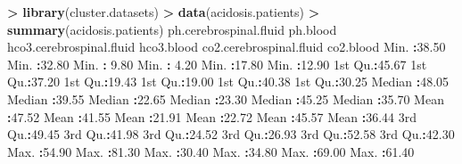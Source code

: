 \documentclass[]{book}
\newenvironment{Shaded}{\begin{snugshade}}{\end{snugshade}}
\newcommand{\KeywordTok}[1]{\textcolor[rgb]{0.13,0.29,0.53}{\textbf{#1}}}
\newcommand{\FloatTok}[1]{\textcolor[rgb]{0.00,0.00,0.81}{#1}}
\newcommand{\StringTok}[1]{\textcolor[rgb]{0.31,0.60,0.02}{#1}}
\newcommand{\OperatorTok}[1]{\textcolor[rgb]{0.81,0.36,0.00}{\textbf{#1}}}
\newcommand{\NormalTok}[1]{#1}
\begin{document}
\begin{Shaded}
\begin{Highlighting}[]
\OperatorTok{>}\StringTok{ }\KeywordTok{library}\NormalTok{(cluster.datasets)}
\OperatorTok{>}\StringTok{ }\KeywordTok{data}\NormalTok{(acidosis.patients)}
\OperatorTok{>}\StringTok{ }\KeywordTok{summary}\NormalTok{(acidosis.patients)}
\NormalTok{ ph.cerebrospinal.fluid    ph.blood     hco3.cerebrospinal.fluid   hco3.blood    co2.cerebrospinal.fluid   co2.blood    }
\NormalTok{ Min.   }\OperatorTok{:}\FloatTok{38.50}\NormalTok{          Min.   }\OperatorTok{:}\FloatTok{32.80}\NormalTok{   Min.   }\OperatorTok{:}\StringTok{ }\FloatTok{9.80}\NormalTok{            Min.   }\OperatorTok{:}\StringTok{ }\FloatTok{4.20}\NormalTok{   Min.   }\OperatorTok{:}\FloatTok{17.80}\NormalTok{           Min.   }\OperatorTok{:}\FloatTok{12.90}  
\NormalTok{ 1st Qu.}\OperatorTok{:}\FloatTok{45.67}\NormalTok{          1st Qu.}\OperatorTok{:}\FloatTok{37.20}\NormalTok{   1st Qu.}\OperatorTok{:}\FloatTok{19.43}\NormalTok{            1st Qu.}\OperatorTok{:}\FloatTok{19.00}\NormalTok{   1st Qu.}\OperatorTok{:}\FloatTok{40.38}\NormalTok{           1st Qu.}\OperatorTok{:}\FloatTok{30.25}  
\NormalTok{ Median }\OperatorTok{:}\FloatTok{48.05}\NormalTok{          Median }\OperatorTok{:}\FloatTok{39.55}\NormalTok{   Median }\OperatorTok{:}\FloatTok{22.65}\NormalTok{            Median }\OperatorTok{:}\FloatTok{23.30}\NormalTok{   Median }\OperatorTok{:}\FloatTok{45.25}\NormalTok{           Median }\OperatorTok{:}\FloatTok{35.70}  
\NormalTok{ Mean   }\OperatorTok{:}\FloatTok{47.52}\NormalTok{          Mean   }\OperatorTok{:}\FloatTok{41.55}\NormalTok{   Mean   }\OperatorTok{:}\FloatTok{21.91}\NormalTok{            Mean   }\OperatorTok{:}\FloatTok{22.72}\NormalTok{   Mean   }\OperatorTok{:}\FloatTok{45.57}\NormalTok{           Mean   }\OperatorTok{:}\FloatTok{36.44}  
\NormalTok{ 3rd Qu.}\OperatorTok{:}\FloatTok{49.45}\NormalTok{          3rd Qu.}\OperatorTok{:}\FloatTok{41.98}\NormalTok{   3rd Qu.}\OperatorTok{:}\FloatTok{24.52}\NormalTok{            3rd Qu.}\OperatorTok{:}\FloatTok{26.93}\NormalTok{   3rd Qu.}\OperatorTok{:}\FloatTok{52.58}\NormalTok{           3rd Qu.}\OperatorTok{:}\FloatTok{42.30}  
\NormalTok{ Max.   }\OperatorTok{:}\FloatTok{54.90}\NormalTok{          Max.   }\OperatorTok{:}\FloatTok{81.30}\NormalTok{   Max.   }\OperatorTok{:}\FloatTok{30.40}\NormalTok{            Max.   }\OperatorTok{:}\FloatTok{34.80}\NormalTok{   Max.   }\OperatorTok{:}\FloatTok{69.00}\NormalTok{           Max.   }\OperatorTok{:}\FloatTok{61.40}  
\end{Highlighting}
\end{Shaded}
\end{document}
